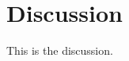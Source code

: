 \documentclass[../main.tex]{subfiles}
\begin{document}
\section{Discussion}

This is the discussion.
\end{document}
